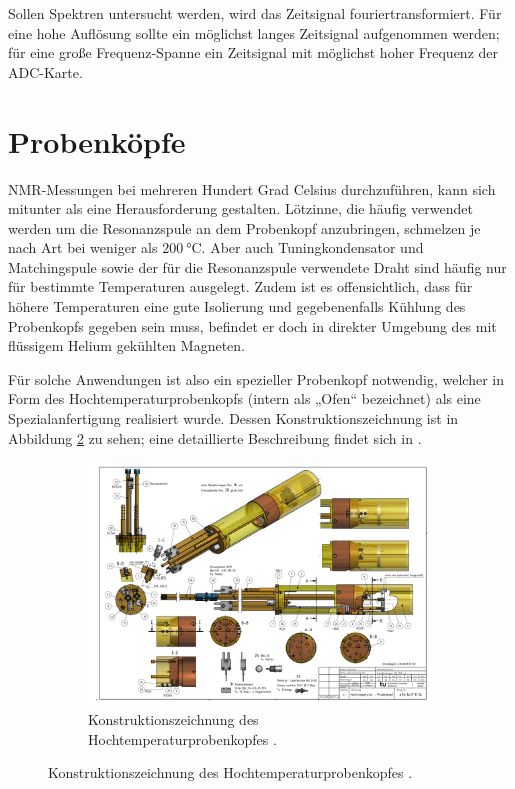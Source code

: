 Sollen Spektren untersucht werden, wird das Zeitsignal fouriertransformiert. Für eine hohe Auflösung sollte ein möglichst langes Zeitsignal aufgenommen werden; für eine große Frequenz-Spanne ein Zeitsignal mit möglichst hoher Frequenz der ADC-Karte.



\section{Probenköpfe} \label{section:exp:probenkoepfe}

NMR-Messungen bei mehreren Hundert Grad Celsius durchzuführen, kann sich mitunter als eine Herausforderung gestalten. Lötzinne, die häufig verwendet werden um die Resonanzspule an dem Probenkopf anzubringen, schmelzen je nach Art bei weniger als $\SI{200}{\degreeCelsius}$. Aber auch Tuningkondensator und Match\-ing\-spu\-le sowie der für die Resonanzspule verwendete Draht sind häufig nur für bestimmte Temperaturen ausgelegt. Zudem ist es offensichtlich, dass für höhere Temperaturen eine gute Isolierung und gegebenenfalls Kühlung des Probenkopfs gegeben sein muss, befindet er doch in direkter Umgebung des mit flüssigem Helium gekühlten Magneten.

Für solche Anwendungen ist also ein spezieller Probenkopf notwendig, welcher in Form des Hochtemperaturprobenkopfs (intern als „Ofen“ bezeichnet) als eine Spezialanfertigung realisiert wurde. Dessen Konstruktionszeichnung ist in Abbildung \ref{fig:exp:ofen_aufbau} zu sehen; eine detaillierte Beschreibung findet sich in \cite{tilly_master}.

\begin{figure}
	\begin{figure}[H]
		\includegraphics[width=1.05\textheight]{graphics/ofen/ofen_aufbau2.pdf}
		\caption{Konstruktionszeichnung des Hochtemperaturprobenkopfes \cite{Rudloff_blue_print}.}
		\label{fig:exp:ofen_aufbau}
	\end{figure}
\end{figure}

